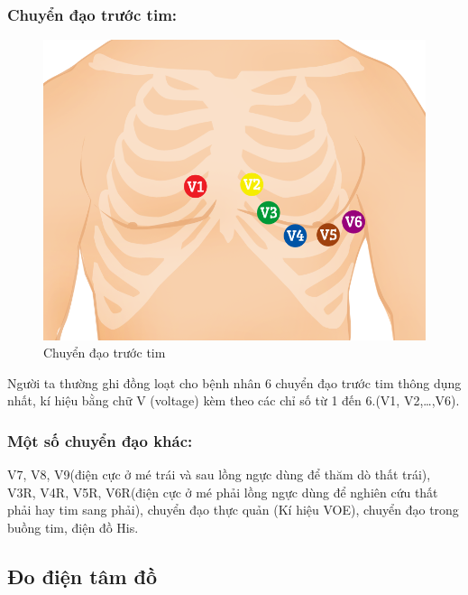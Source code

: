 \subsubsection{Chuyển đạo trước tim:}
\begin{center}
    \begin{figure}[htp]
    \begin{center}
    \includegraphics[scale=.25]{image/week1/chuyendaotruocnguc.png}
    \end{center}
    \caption{Chuyển đạo trước tim}
    \end{figure}
\end{center}
Người ta thường ghi đồng loạt cho bệnh nhân 6 chuyển đạo trước tim thông dụng nhất, kí hiệu bằng chữ V (voltage) kèm theo các chỉ số từ 1 đến 6.(V1, V2,…,V6).

\subsubsection{Một số chuyển đạo khác:}
V7, V8, V9(điện cực ở mé trái và sau lồng ngực dùng để thăm dò thất trái), V3R, V4R, V5R, V6R(điện cực ở mé phải lồng ngực dùng để nghiên cứu thất phải hay tim sang phải), chuyển đạo thực quản (Kí hiệu VOE), chuyển đạo trong buồng tim, điện đồ His.

\subsection{Đo điện tâm đồ}

